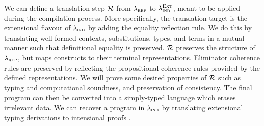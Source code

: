 We can define a translation step $\mathcal{R}$ from $\lambda_{\textsc{rep}}$ to
$\lambda_{\textsc{ind}}^{\textsc{Ext}}$, meant to be applied during the compilation process.
More specifically, the translation target is the extensional flavour of
$\lambda_{\textsc{ind}}$ by adding the equality reflection rule. We do this by translating
well-formed contexts, substitutions, types, and terms in a mutual manner such
that definitional equality is preserved. $\mathcal{R}$ preserves the structure of
$\lambda_{\textsc{rep}}$, but maps constructs to their terminal representations. Eliminator
coherence rules are preserved by reflecting the propositional coherence rules
provided by the defined representations. We will prove some desired properties
of $\mathcal{R}$ \cite{Boulier2017-cm} such as typing and computational soundness, and
preservation of consistency. The final program can then be converted into a
simply-typed language which erases irrelevant data. We can recover a program in
$\lambda_{\textsc{ind}}$ by translating extensional typing derivations to intensional proofs
\cite{Winterhalter2019-zw}.
